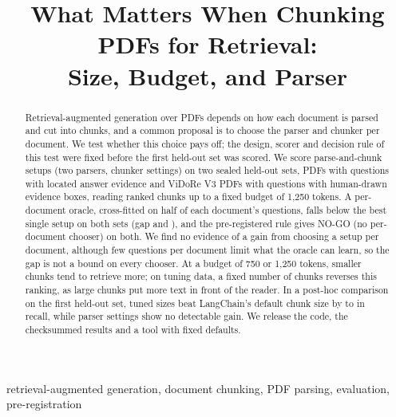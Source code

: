 \documentclass[conference]{IEEEtran}
\begin{document}
\makeatletter{}\makeatother %

\title{What Matters When Chunking PDFs for Retrieval:\\Size, Budget, and Parser}
\author{
}
\maketitle
{}

\begin{abstract}
Retrieval-augmented generation over PDFs depends on how each document is
parsed and cut into chunks, and a common proposal is to choose the parser and
chunker per document. We test whether this choice pays off; the
design, scorer and decision rule of this test were fixed before the first
held-out set was scored.
We score \RQoneSetups{} parse-and-chunk setups (two parsers,
\RQonePrimarySettings{} chunker settings) on two sealed held-out sets,
\RQoneDocuments{} PDFs with \RQoneQuestions{} questions with located answer evidence and
\RQoneHTwoDropRuleDocuments{} ViDoRe V3 PDFs with
\RQoneHTwoDropRuleQuestions{} questions with human-drawn evidence boxes, reading ranked chunks up to
a fixed budget of 1,250 tokens. A per-document oracle, cross-fitted on half of
each document's questions, falls below the best single setup on both sets
(gap \RQonePrimaryGap{} \RQonePrimaryGapCI{} and \RQoneHTwoDropRuleGap{}
\RQoneHTwoDropRuleGapCI{}), and the pre-registered rule gives NO-GO (no per-document chooser) on both.
We find no evidence of a gain from choosing a setup per document, although
few questions per document limit what the oracle can learn, so the gap is not
a bound on every chooser. At a budget of
750 or 1,250 tokens, smaller chunks tend to retrieve more; on tuning data,
a fixed number of chunks reverses this ranking, as large chunks put more text
in front of the reader. In a post-hoc comparison on the first held-out set,
tuned sizes beat LangChain's default chunk size by \RQfiveBLangchainRecursivePdfplumberDiff{}
to \RQfiveBLangchainRecursiveDoclingDiff{} in recall, while parser settings
show no detectable gain. We release the code, the checksummed results and a tool
with fixed defaults.
\end{abstract}

\begin{IEEEkeywords}
retrieval-augmented generation, document chunking, PDF parsing, evaluation, pre-registration
\end{IEEEkeywords}
\end{document}
